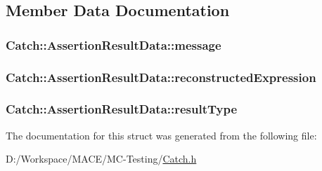 \subsection{Member Data Documentation}
\subsubsection[{\texorpdfstring{message}{message}}]{ Catch\+::\+Assertion\+Result\+Data\+::message}\hypertarget{struct_catch_1_1_assertion_result_data_ac34215803c4c4a88f795879f61c1f7b4}{}\label{struct_catch_1_1_assertion_result_data_ac34215803c4c4a88f795879f61c1f7b4}
\subsubsection[{\texorpdfstring{reconstructed\+Expression}{reconstructedExpression}}]{ Catch\+::\+Assertion\+Result\+Data\+::reconstructed\+Expression}\hypertarget{struct_catch_1_1_assertion_result_data_a9e809d36fffbeb1c7d0cbe7382dd9595}{}\label{struct_catch_1_1_assertion_result_data_a9e809d36fffbeb1c7d0cbe7382dd9595}
\subsubsection[{\texorpdfstring{result\+Type}{resultType}}]{ Catch\+::\+Assertion\+Result\+Data\+::result\+Type}\hypertarget{struct_catch_1_1_assertion_result_data_a7ceab4a7ff722aec5587e3748caf66b7}{}\label{struct_catch_1_1_assertion_result_data_a7ceab4a7ff722aec5587e3748caf66b7}


The documentation for this struct was generated from the following file\+:\begin{DoxyCompactItemize}
\item 
D\+:/\+Workspace/\+M\+A\+C\+E/\+M\+C-\/\+Testing/\hyperlink{_catch_8h}{Catch.\+h}\end{DoxyCompactItemize}
